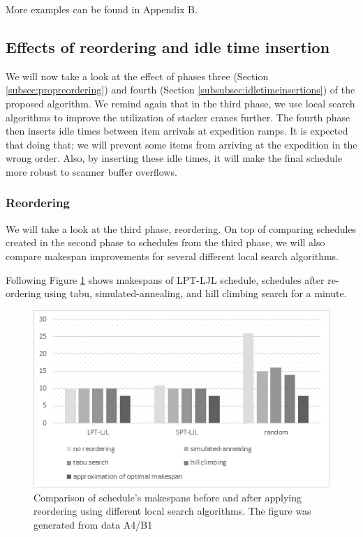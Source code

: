\documentclass{ctuthesis}
\begin{document}
More examples can be found in Appendix B.

\subsection{Effects of reordering and idle time insertion}

We will now take a look at the effect of phases three (Section \ref{subsec:propreordering}) and fourth (Section \ref{subsubsec:idletimeinsertions}) of the proposed algorithm. We remind again that in the third phase, we use local search algorithms to improve the utilization of stacker cranes further. The fourth phase then inserts idle times between item arrivals at expedition ramps. It is expected that doing that; we will prevent some items from arriving at the expedition in the wrong order. Also, by inserting these idle times, it will make the final schedule more robust to scanner buffer overflows.

\subsubsection{Reordering}
\label{subsubsec:reordering}
We will take a look at the third phase, reordering. On top of comparing schedules created in the second phase to schedules from the third phase, we will also compare makespan improvements for several different local search algorithms.

Following Figure \ref{fig:reor1} shows makespans of LPT-LJL schedule, schedules after re-ordering using tabu, simulated-annealing, and hill climbing search for a minute.

\begin{figure}[H]
\includegraphics[width=1\linewidth]{reor1.png}
\caption{Comparison of schedule's makespans before and after applying reordering using different local search algorithms. The figure was generated from data A4/B1}
\label{fig:reor1}
\end{figure}
\end{document}
